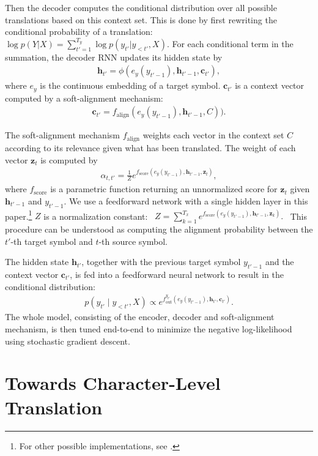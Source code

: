 \documentclass[11pt]{article}
\newcommand{\vect}[1]{\mathbf{#1}}
\newcommand{\vc}[0]{\vect{c}}
\newcommand{\vh}[0]{\vect{h}}
\newcommand{\vz}[0]{\vect{z}}
\begin{document}
Then the decoder computes the conditional distribution over all possible
translations based on this context set. This is done by first rewriting the
conditional probability of a translation:
$
    \log p(Y|X) = \sum_{t'=1}^{T_y} \log p(y_{t'} | y_{<t'},
    X).
$
For each conditional term in the summation, the decoder RNN updates its hidden
state by
\begin{align}
    \label{eq:dec_state}
    \vh_{t'} = \phi(e_y(y_{t'-1}), \vh_{t'-1}, \vc_{t'}),
\end{align}
where $e_y$ is the continuous embedding of a target symbol. $\vc_{t'}$ is a
context vector computed by a soft-alignment mechanism:
\begin{align}
    \label{eq:att_context}
    \vc_{t'} = f_{\mathrm{align}}(e_y(y_{t'-1}), \vh_{t'-1}, C)).
\end{align}

The soft-alignment mechanism $f_{\mathrm{align}}$ weights each vector in the
context set $C$
according to its relevance given
what has been translated. 
The weight of each vector $\vz_t$ is computed by
\begin{align}
    \label{eq:att}
    \alpha_{t, t'} = \frac{1}{Z}e^{f_{\mathrm{score}} (e_y(y_{t'-1}), \vh_{t'-1}, \vz_t)},
\end{align}
where $f_{\mathrm{score}}$ is a parametric function returning an unnormalized
score for $\vz_t$ given $\vh_{t'-1}$ and $y_{t'-1}$. We use a feedforward
network with a single hidden layer in this paper.\footnote{
    {\scriptsize For other possible implementations, see \cite{luong2015effective}.}
} $Z$ is a normalization constant:
\mbox{
$
    Z = \sum_{k=1}^{T_x} e^{f_{\mathrm{score}} (e_y(y_{t'-1}), \vh_{t'-1}, \vz_k)}.
$
}
This procedure can be understood as computing the alignment probability between
the $t'$-th target symbol and $t$-th source symbol.

The hidden state $\vh_{t'}$, together with the previous target symbol $y_{t'-1}$
and the context vector $\vc_{t'}$, is fed into a feedforward neural network to
result in the conditional distribution:
\begin{align}
    \label{eq:output}
    p(y_{t'}\mid y_{<t'}, X) \propto
    e^{f^{y_{t'}}_{\mathrm{out}}(e_y(y_{t'-1}), \vh_{t'}, \vc_{t'})}.
\end{align}
The whole model, consisting of the encoder, decoder and soft-alignment
mechanism, is then tuned end-to-end to minimize the negative log-likelihood using stochastic gradient descent.

\section{Towards Character-Level Translation}
\label{sec:motivation}
\end{document}
